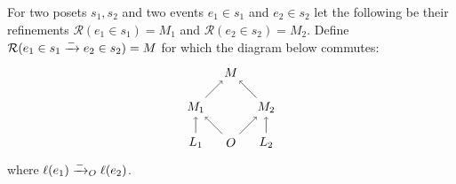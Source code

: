 \begin{definition}
\label{def:ref_neg_infl}
  For two posets $s_1,s_2$ and two events $e_1\in s_1$ and $e_2\in s_2$ let the following be their refinements $\mathcal{R}(e_1\in s_1) = M_1$ and $\mathcal{R}(e_2\in s_2) = M_2$. Define $\mathcal{R}(e_1\in s_1\mathrel{\xrightarrow{-}} e_2\in s_2) = M$ for which the diagram below commutes:
  \[
  \begin{tikzpicture} %
    \node (o) at (0,0) {\(O\)};
    \node (n) at (0,2) {\(M\)};
    \node (l1) at (-1,0) {\(L_1\)};
    \node (l2) at (1,0) {\(L_2\)};
    \node (n1) at (-1,1) {\(M_1\)};
    \node (n2) at (1,1) {\(M_2\)};
    \draw [->] (l1) -- (n1);
    \draw [->] (l2) -- (n2);
    \draw [->] (o) -- (n1);
    \draw [->] (o) -- (n2);
    \draw [->] (n1) -- (n);
    \draw [->] (n2) -- (n);
  \end{tikzpicture}
  \]
  where $\ell(e_1)\mathrel{\xrightarrow{-}}_O\ell(e_2)$.
\end{definition}
